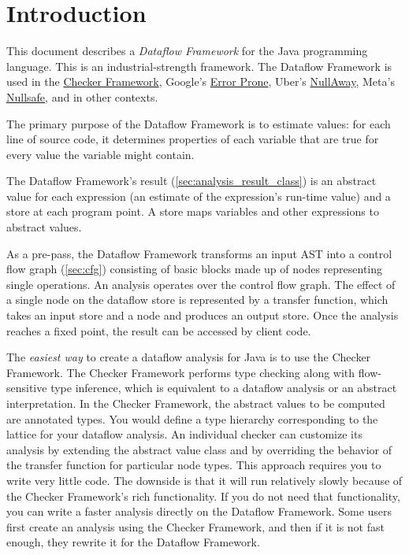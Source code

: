 

\section{Introduction}

This document describes a \emph{Dataflow Framework} for the Java
programming language.  This is an industrial-strength framework.
The Dataflow Framework is used in the
\href{https://checkerframework.org/}{Checker Framework},
Google's \href{https://errorprone.info/}{Error Prone},
Uber's \href{https://github.com/uber/NullAway}{NullAway},
Meta's \href{https://engineering.fb.com/2022/11/22/developer-tools/meta-java-nullsafe/}{Nullsafe},
and in other contexts.

The primary purpose of the Dataflow Framework is to estimate values:
for each line of source code, it determines properties of
each variable that are true for every value the variable might contain.

The Dataflow Framework's result (\autoref{sec:analysis_result_class})
is an abstract value for each expression (an estimate of the
expression's run-time value) and a store at each program point.  A
store maps variables and other expressions to abstract
values.

As a pre-pass, the Dataflow Framework transforms an input
AST into a control flow graph (\autoref{sec:cfg}) consisting of basic
blocks made up of nodes representing single operations.  An analysis
operates over the control flow graph.  The effect of a single node on
the dataflow store is represented by a transfer function, which takes
an input store and a node and produces an output store.  Once the
analysis reaches a fixed point, the result can be accessed by client
code.

The \emph{easiest way} to create a dataflow analysis for Java is to use the
Checker Framework.  The Checker Framework performs type checking along with
flow-sensitive type inference, which is equivalent to a dataflow analysis or
an abstract interpretation.
In the Checker Framework, the abstract values to be computed are
annotated types.  You would define a type hierarchy corresponding to the
lattice for your dataflow analysis.
An individual checker can customize its analysis by
extending the abstract value class and by overriding the behavior of
the transfer function for particular node types.
This approach requires you to write very little code.  The downside is
that it will run relatively slowly because of the Checker Framework's rich
functionality.  If you do not need that functionality, you can write a
faster analysis directly on the Dataflow Framework.  Some users first
create an analysis using the Checker Framework, and then if it is not fast
enough, they rewrite it for the Dataflow Framework.


